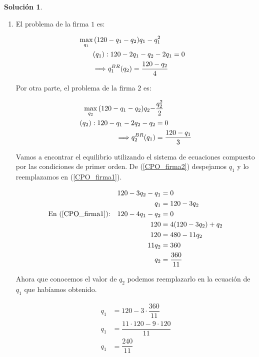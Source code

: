 \documentclass[a4paper, 11pt]{article}
\theoremstyle{definition}
\newtheorem{solucion}{Soluci\'on}
\begin{document}
\begin{solucion} %
\

\begin{enumerate}[label=(\alph*)]
\item
El problema de la firma $1$ es:

\vspace*{-16pt}

\begin{align}
\displaystyle\max_{q_1} &\,(120-q_1-q_2) q_1- q_1^2& \notag\\
&(q_1): 120-2q_1-q_2-2q_1=0 \label{CPO_firma1}\\
&\Longrightarrow q_1^{BR}(q_2)=\dfrac{120-q_2}{4} \notag
\end{align}

Por otra parte, el problema de la firma $2$ es:

\vspace*{-16pt}

\begin{align}
\displaystyle\max_{q_2} \,(120-q_1-q_2) q_2-&\dfrac{q_2^2}{2} \notag\\
(q_2): 120-q_1-2q_2-q_2 &=0 \label{CPO_firma2}\\
\Longrightarrow q_2^{BR}(q_1) &=\dfrac{120-q_1}{3} \notag
\end{align}

Vamos a encontrar el equilibrio utilizando el sistema de ecuaciones compuesto por las condiciones de primer orden. De (\ref{CPO_firma2}) despejamos $q_1$ y lo reemplazamos en (\ref{CPO_firma1}).

\vspace*{-16pt}

\begin{align*}
120-3q_2-q_1&=0\\
q_1&=120-3q_2\\
\text{En (\ref{CPO_firma1}):} \quad 120-4q_1-q_2&=0\\
120&=4(120-3q_2)+q_2\\
120&=480-11q_2\\
11q_2&=360\\
q_2&=\dfrac{360}{11}
\end{align*}

Ahora que  conocemos el valor de $q_2$ podemos reemplazarlo en la ecuación de  $q_1$ que habíamos obtenido.

\vspace*{-16pt}

\begin{align*}
q_1&=120-3\cdot\dfrac{360}{11}\\
q_1&=\dfrac{11\cdot120-9\cdot120}{11}\\
q_1&=\dfrac{240}{11}
\end{align*}


\end{enumerate}
\end{solucion}
\end{document}
